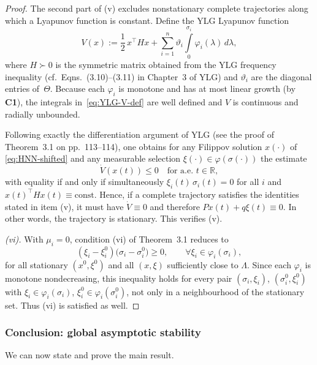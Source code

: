 \documentclass[journal]{IEEEtran}
\newtheorem{proof}{Proof}
\begin{document}
\begin{proof}
The second part of (v) excludes nonstationary complete trajectories
along which a Lyapunov function is constant.  Define the YLG
Lyapunov function
\begin{equation}\label{eq:YLG-V-def}
    V(x)
    := \frac12\,x^\top H x + 
       \sum_{i=1}^n \vartheta_i
       \int\limits_0^{\sigma_i} \varphi_i(\lambda)\,d\lambda,
\end{equation}
where $H\succ0$ is the symmetric matrix obtained from the YLG
frequency inequality (cf.\ Eqns.~(3.10)–(3.11) in Chapter~3 of YLG)
and $\vartheta_i$ are the diagonal entries of~$\Theta$.  Because each
$\varphi_i$ is monotone and has at most linear growth (by
\textbf{C1}), the integrals in~\eqref{eq:YLG-V-def} are well defined
and $V$ is continuous and radially unbounded.

Following exactly the differentiation argument of YLG (see the proof
of Theorem~3.1 on pp.~113–114), one obtains for any Filippov solution
$x(\cdot)$ of \eqref{eq:HNN-shifted} and any measurable selection
$\xi(\cdot)\in\varphi(\sigma(\cdot))$ the estimate
\[
  \dot V(x(t)) \le 0 \quad\text{for a.e. }t\in\mathbb{R},
\]
with equality if and only if simultaneously
$\xi_i(t)\,\sigma_i(t)=0$ for all $i$ and
$x(t)^\top H x(t)\equiv\mathrm{const}$.  Hence, if a complete
trajectory satisfies the identities stated in item (v), it must have
$\dot V\equiv 0$ and therefore $Px(t)+q\xi(t)\equiv 0$.  In other
words, the trajectory is stationary.  This verifies (v).

\smallskip\noindent
\textit{(vi).}
With $\mu_i=0$, condition (vi) of Theorem~3.1 reduces to
\[
  (\xi_i-\xi_i^0)\bigl(\sigma_i-\sigma_i^0\bigr) \ge 0,
  \qquad \forall\xi_i\in\varphi_i(\sigma_i),
\]
for all stationary $(x^0,\xi^0)$ and all $(x,\xi)$ sufficiently close
to $\Lambda$.  Since each $\varphi_i$ is monotone nondecreasing, this
inequality holds for every pair $(\sigma_i,\xi_i)$,
$(\sigma_i^0,\xi_i^0)$ with $\xi_i\in\varphi_i(\sigma_i)$,
$\xi_i^0\in\varphi_i(\sigma_i^0)$, not only in a neighbourhood of the
stationary set.  Thus (vi) is satisfied as well.
\end{proof}

\subsubsection*{Conclusion: global asymptotic stability}

We can now state and prove the main result.
\end{document}
